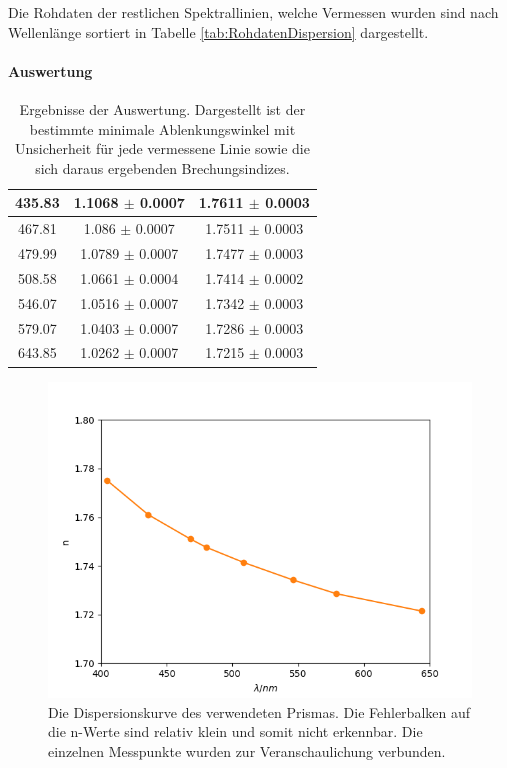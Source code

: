 \documentclass[12pt,a4paper]{article}
\begin{document}
	
	Die Rohdaten der restlichen Spektrallinien, welche Vermessen wurden sind nach Wellenlänge sortiert in Tabelle \ref{tab:RohdatenDispersion} dargestellt.
	
	
	\paragraph{Auswertung}
	
	\begin{table}
		\begin{center}
			\begin{tabular}{|c|c|c|}
				\hline
				435.83 & 1.1068 $\pm$ 0.0007 & 1.7611 $\pm$ 0.0003 \\ 
				\hline
				467.81 & 1.086 $\pm$ 0.0007 & 1.7511 $\pm$ 0.0003 \\
				\hline
				479.99 & 1.0789 $\pm$ 0.0007 & 1.7477 $\pm$ 0.0003 \\
				\hline
				508.58 & 1.0661 $\pm$ 0.0004 & 1.7414 $\pm$ 0.0002 \\
				\hline
				546.07 & 1.0516 $\pm$ 0.0007 & 1.7342 $\pm$ 0.0003 \\
				\hline
				579.07 & 1.0403 $\pm$ 0.0007 & 1.7286 $\pm$ 0.0003 \\
				\hline
				643.85 & 1.0262 $\pm$ 0.0007 & 1.7215 $\pm$ 0.0003 \\ 
				\hline
			\end{tabular}
			\caption{Ergebnisse der Auswertung. Dargestellt ist der bestimmte minimale Ablenkungswinkel mit Unsicherheit für jede vermessene Linie sowie die sich daraus ergebenden Brechungsindizes.}
			\label{tab:AuswertungDispersion}
		\end{center}
	\end{table}
	
	\begin{figure}
		\includegraphics[scale=1.0]{Bilder/Dispersionskurve.png}
		\caption{Die Dispersionskurve des verwendeten Prismas. Die Fehlerbalken auf die n-Werte sind relativ klein und somit nicht erkennbar. Die einzelnen Messpunkte wurden zur Veranschaulichung verbunden.}\label{fig:Dispersionskurve}
	\end{figure}
	
\end{document}
